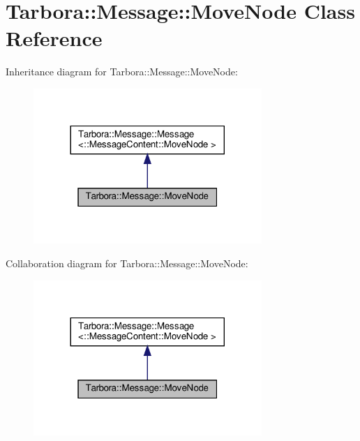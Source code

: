 \hypertarget{classTarbora_1_1Message_1_1MoveNode}{}\section{Tarbora\+:\+:Message\+:\+:Move\+Node Class Reference}
\label{classTarbora_1_1Message_1_1MoveNode}


Inheritance diagram for Tarbora\+:\+:Message\+:\+:Move\+Node\+:
\nopagebreak
\begin{figure}[H]
\begin{center}
\leavevmode
\includegraphics[width=245pt]{classTarbora_1_1Message_1_1MoveNode__inherit__graph}
\end{center}
\end{figure}


Collaboration diagram for Tarbora\+:\+:Message\+:\+:Move\+Node\+:
\nopagebreak
\begin{figure}[H]
\begin{center}
\leavevmode
\includegraphics[width=245pt]{classTarbora_1_1Message_1_1MoveNode__coll__graph}
\end{center}
\end{figure}
